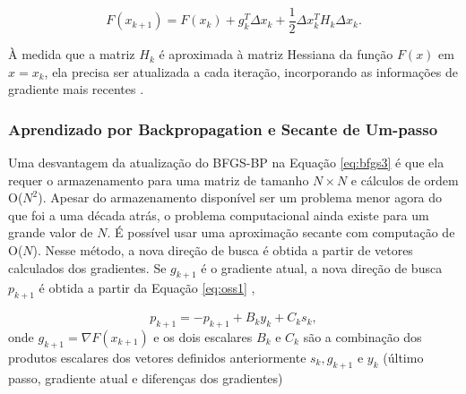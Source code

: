 \begin{equation}
\label{eq:bfgs3}
F(x_{k+1}) = F(x_{k})+ g^T_k\Delta x_k + \frac{1}{2}\Delta x^T_k H_k \Delta x_k.
\end{equation}

À medida que a matriz $H_k$ é aproximada à matriz Hessiana da função $F(x)$ em $x = x_k$, ela precisa ser atualizada a cada iteração, incorporando as informações de gradiente mais recentes \cite{saini2002artificial}.

\subsubsection{Aprendizado por Backpropagation e Secante de Um-passo}

Uma desvantagem da atualização do BFGS-BP na Equação \ref{eq:bfgs3} é que ela requer o armazenamento para uma matriz de tamanho $N \times N$ e cálculos de ordem O($N^ 2$). Apesar do armazenamento disponível ser um problema menor agora do que foi a uma década atrás, o problema computacional ainda existe para um grande valor de $N$. É possível usar uma aproximação secante com computação de O($N$). Nesse método, a nova direção de busca é obtida a partir de vetores calculados dos gradientes. Se $g_{k+1}$ é o gradiente atual, a nova direção de busca $p_{k+1}$ \label{symbol:novadirecaoOSS} é obtida a partir da Equação \ref{eq:oss1} \cite{saini2002artificial},

\begin{equation}
\label{eq:oss1}
p_{k+1} = - p_{k+1} + B_k y_k +C_k s_k , 
\end{equation}
onde $g_{k+1} = \nabla F(x_{k+1})$ e os dois escalares $B_k$ e $C_k$ são a combinação dos produtos escalares dos vetores definidos anteriormente $s_k, g_{k+1}$ e $y_k$ (último passo, gradiente atual e diferenças dos gradientes)

